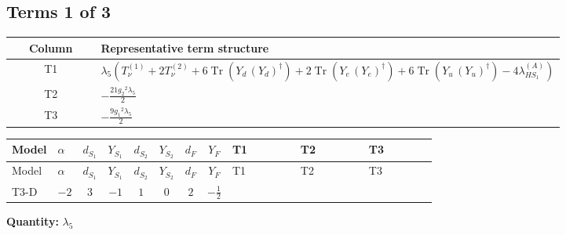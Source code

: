 \documentclass[8pt]{article}
\begin{document}
\begin{landscape}
\subsection*{Terms 1 of 3}
\begin{center}
\begin{tabular}{@{}c >{\raggedright\arraybackslash}p{0.82\linewidth}@{}}
\toprule
Column & Representative term structure \\
\midrule
T1 & \(\displaystyle {\lambda_5} (T_{\nu}^{(1)}+2 T_{\nu}^{(2)}+6 \operatorname{Tr}\!\left({Y_d}\,\left({Y_d}\right)^{\dagger}\right)+2 \operatorname{Tr}\!\left({Y_e}\,\left({Y_e}\right)^{\dagger}\right)+6 \operatorname{Tr}\!\left({Y_u}\,\left({Y_u}\right)^{\dagger}\right)-4 {\lambda_{HS_1}^{(A)}})\) \\
\midrule
T2 & \(\displaystyle -\frac{21 {g_2}^2 {\lambda_5}}{2}\) \\
\midrule
T3 & \(\displaystyle -\frac{9 {g_1}^2 {\lambda_5}}{2}\) \\
\midrule
\bottomrule
\end{tabular}
\end{center}
\smallskip
\tiny
\begin{longtable}{@{}llcccccc >{\raggedright\arraybackslash}p{0.21\linewidth} >{\raggedright\arraybackslash}p{0.21\linewidth} >{\raggedright\arraybackslash}p{0.21\linewidth}@{}}
\toprule
Model & $\alpha$ & $d_{S_1}$ & $Y_{S_1}$ & $d_{S_2}$ & $Y_{S_2}$ & $d_F$ & $Y_F$ & T1 & T2 & T3 \\
\midrule
\endfirsthead
\toprule
Model & $\alpha$ & $d_{S_1}$ & $Y_{S_1}$ & $d_{S_2}$ & $Y_{S_2}$ & $d_F$ & $Y_F$ & T1 & T2 & T3 \\
\midrule
\endhead
T3-D & $-2$ & $3$ & $-1$ & $1$ & $0$ & $2$ & $-\frac{1}{2}$ & \scriptsize\adjustbox{max width=\linewidth}{$\begin{gathered} {\lambda_5} (T_{\nu}^{(1)}+2 T_{\nu}^{(2)}+6 \operatorname{Tr}\!\left({Y_d}\,\left({Y_d}\right)^{\dagger}\right)+2 \operatorname{Tr}\!\left({Y_e}\,\left({Y_e}\right)^{\dagger}\right)+6 \operatorname{Tr}\!\left({Y_u}\,\left({Y_u}\right)^{\dagger}\right)-4 {\lambda_{HS_1}^{(A)}})\end{gathered}$} & \scriptsize\adjustbox{max width=\linewidth}{$\begin{gathered} -\frac{21 {g_2}^2 {\lambda_5}}{2}\end{gathered}$} & \scriptsize\adjustbox{max width=\linewidth}{$\begin{gathered} -\frac{9 {g_1}^2 {\lambda_5}}{2}\end{gathered}$} \\
\midrule
\bottomrule
\end{longtable}
\clearpage
\noindent\textbf{Quantity: }$\lambda_5$\par\smallskip

\end{landscape}
\end{document}
